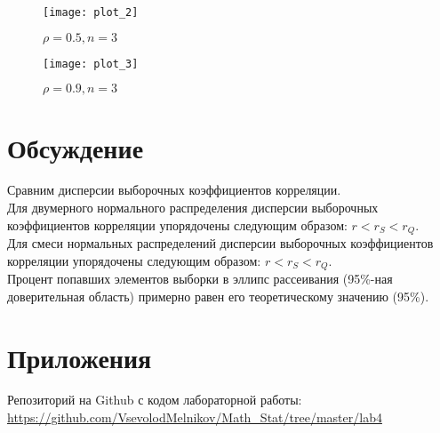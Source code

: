 \begin{figure}[!htb]
    \centering
    \texttt{[image: plot\_2]}
    \caption{$\rho=0.5, n=3$}
\end{figure}

\begin{figure}[!htb]
    \centering
    \texttt{[image: plot\_3]}
    \caption{$\rho=0.9, n=3$}
\end{figure}
\newpage
\section{Обсуждение}
Сравним дисперсии выборочных коэффициентов корреляции.\\
Для двумерного нормального распределения дисперсии выборочных коэффициентов корреляции упорядочены следующим образом: $r<r_S<r_Q$.\\
Для смеси нормальных распределений дисперсии выборочных коэффициентов корреляции упорядочены следующим образом: $r<r_S<r_Q$.\\
Процент попавших элементов выборки в эллипс рассеивания (95\%-ная доверительная область) примерно равен его теоретическому значению (95\%).

\section{Приложения}
Репозиторий на Github с кодом лабораторной работы:\\
\url{https://github.com/VsevolodMelnikov/Math_Stat/tree/master/lab4}

